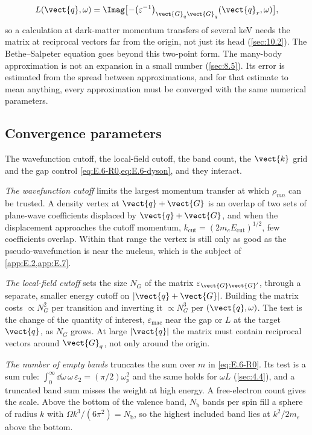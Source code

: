 \begin{equation}
  L(\vect{q},\omega) = \Imag\bigl[-\bigl(\varepsilon^{-1}\bigr)_{\vect{G}_q\vect{G}_q}(\vect{q}_r,\omega)\bigr] ,
  \label{eq:E.6-L}
\end{equation}
so a calculation at dark-matter momentum transfers of several keV needs the matrix at reciprocal vectors far from the origin, not just its head (\cref{sec:10.2}). The Bethe--Salpeter equation goes beyond this two-point form. The many-body approximation is not an expansion in a small number (\cref{sec:8.5}). Its error is estimated from the spread between approximations, and for that estimate to mean anything, every approximation must be converged with the same numerical parameters.

\subsection{Convergence parameters}

The wavefunction cutoff, the local-field cutoff, the band count, the $\vect{k}$ grid and the gap control \cref{eq:E.6-R0,eq:E.6-dyson}, and they interact.

\emph{The wavefunction cutoff} limits the largest momentum transfer at which $\rho_{mn}$ can be trusted. A density vertex at $\vect{q}+\vect{G}$ is an overlap of two sets of plane-wave coefficients displaced by $\vect{q}+\vect{G}$, and when the displacement approaches the cutoff momentum, $k_{\mathrm{cut}} = (2m_eE_{\mathrm{cut}})^{1/2}$, few coefficients overlap. Within that range the vertex is still only as good as the pseudo-wavefunction is near the nucleus, which is the subject of \cref{app:E.2,app:E.7}.

\emph{The local-field cutoff} sets the size $N_G$ of the matrix $\varepsilon_{\vect{G}\vect{G}'}$, through a separate, smaller energy cutoff on $|\vect{q}+\vect{G}|$. Building the matrix costs $\propto N_G^2$ per transition and inverting it $\propto N_G^3$ per $(\vect{q},\omega)$. The test is the change of the quantity of interest, $\varepsilon_{\mathrm{mac}}$ near the gap or $L$ at the target $\vect{q}$, as $N_G$ grows. At large $|\vect{q}|$ the matrix must contain reciprocal vectors around $\vect{G}_q$, not only around the origin.

\emph{The number of empty bands} truncates the sum over $m$ in \cref{eq:E.6-R0}. Its test is a sum rule: $\int_0^\infty\dd\omega\,\omega\,\varepsilon_2 = (\pi/2)\omega_p^2$ and the same holds for $\omega L$ (\cref{sec:4.4}), and a truncated band sum misses the weight at high energy. A free-electron count gives the scale. Above the bottom of the valence band, $N_{\mathrm{b}}$ bands per spin fill a sphere of radius $k$ with $\Omega k^3/(6\pi^2) = N_{\mathrm{b}}$, so the highest included band lies at $k^2/2m_e$ above the bottom.

